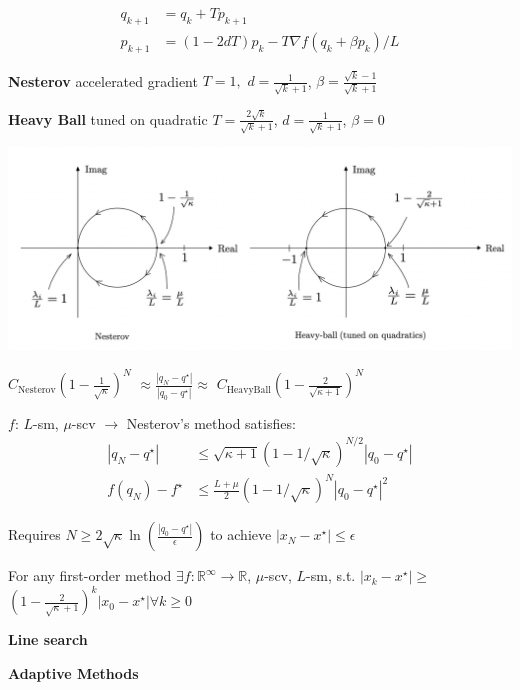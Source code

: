 \[\begin{aligned}
		q_{k+1} & = q_k + Tp_{k+1}                          \\
		p_{k+1} & = (1-2dT)p_k-T\nabla f(q_k + \beta p_k)/L
	\end{aligned}\]

\textbf{Nesterov}
accelerated gradient
$T = 1,$
$d=\frac{1}{\sqrt{k}+1}$,
$\beta =\frac{\sqrt{k}-1}{\sqrt{k}+1}$

\textbf{Heavy Ball}
tuned on quadratic
$T = \frac{2\sqrt{k}}{\sqrt{k}+1}$,
$d=\frac{1}{\sqrt{k}+1}$,
$\beta=0$

\includegraphics[width=\columnwidth]{images/root-locus-momentum.png}

\begin{centering}
	$C_\text{Nesterov}(1-\frac{1}{\sqrt{\kappa}})^N$
	$\approx\frac{|q_N-q^\star|}{|q_0-q^\star|}\approx$
	$C_\text{HeavyBall}(1-\frac{2}{\sqrt{\kappa+1}})^N$
\end{centering}

\begin{theorem}
	$f$: $L$-sm, $\mu$-scv
	$\rightarrow$
	Nesterov's method satisfies:
	\[  \begin{aligned}
			|q_N-q^\star|  & \le
			\sqrt{\kappa+1}(1-1/\sqrt{\kappa})^{N/2}|q_0-q^\star|
			\\
			f(q_N)-f^\star & \le
			\frac{L+\mu}{2}(1-1/\sqrt{\kappa})^{N}|q_0-q^\star|^2
		\end{aligned}\]
\end{theorem}


Requires
$N\ge2\sqrt{\kappa}\operatorname{ln}(\frac{|q_{0}-q^\star|}{\epsilon})$
to achieve
$|x_{N}-x^\star|\le\epsilon$

\begin{theorem}
	For any first-order method
	$\exists f: \mathbb{R}^{\infty}\rightarrow\mathbb{R}$,
	$\mu$-scv, $L$-sm,
	s.t.
	$|x_k - x^\star|\ge$
	$(1-\frac{2}{\sqrt{\kappa}+1})^k|x_0 - x^\star| \forall k\ge 0$

\end{theorem}

\textbf{Line search}

\textbf{Adaptive Methods}
